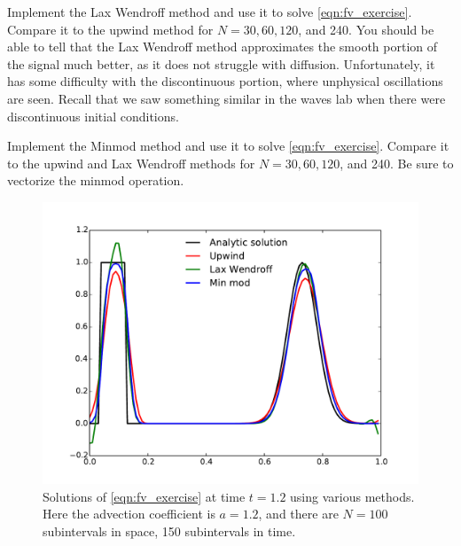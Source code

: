 
\begin{problem}
Implement the Lax Wendroff method and use it to solve \eqref{eqn:fv_exercise}.
Compare it to the upwind method for $N = 30, 60, 120$, and 240.
You should be able to tell that the Lax Wendroff method approximates the smooth portion of the signal much better, as it does not struggle with diffusion.
Unfortunately, it has some difficulty with the discontinuous portion, where unphysical oscillations are seen.
Recall that we saw something similar in the waves lab when there were discontinuous initial conditions.
\end{problem}

\begin{problem}
Implement the Minmod method and use it to solve \eqref{eqn:fv_exercise}.
Compare it to the upwind and Lax Wendroff methods for $N = 30, 60, 120$, and 240.
Be sure to vectorize the minmod operation.
\end{problem}

\begin{figure}
\centering
\includegraphics[width=\textwidth]{FiniteVolume_Comparisons.pdf}
\caption{Solutions of \eqref{eqn:fv_exercise} at time $t = 1.2$ using various methods.
Here the advection coefficient is $a = 1.2$, and there are  $N = 100$ subintervals in space, 150 subintervals in time.}
\label{fig:fv_Comparisons}
\end{figure}

